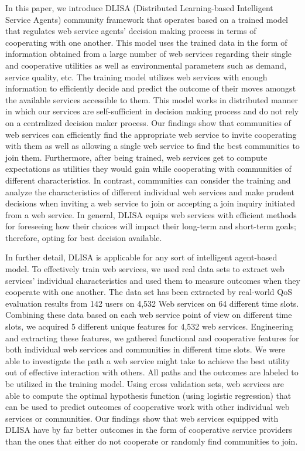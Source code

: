 \documentclass[10pt,journal,cspaper,compsoc]{IEEEtran}
\begin{document}
In this paper, we introduce DLISA (Distributed Learning-based Intelligent Service Agents) community framework that operates based on a trained model that regulates web service agents' decision making process in terms of cooperating with one another. This model uses the trained data in the form of information obtained from a large number of web services regarding their single and cooperative utilities as well as environmental parameters such as demand, service quality, etc. 
The training model utilizes web services with enough information to efficiently decide and predict the outcome of their moves amongst the available services accessible to them. This model works in distributed manner in which our services are self-sufficient in decision making process and do not rely on a centralized decision maker process. Our findings show that communities of web services can efficiently find the appropriate web service to invite cooperating with them as well as allowing a single web service to find the best communities to join them. Furthermore, after being trained, web services get to compute expectations as utilities they would gain while cooperating with communities of different characteristics. In contrast, communities can consider the training and analyze the characteristics of different individual web services and make prudent decisions when inviting a web service to join or accepting a join inquiry initiated from a web service. In general, DLISA equips web services with efficient methods for foreseeing how their choices will impact their long-term and short-term goals; therefore, opting for best decision available. 

In further detail, DLISA is applicable for any sort of intelligent agent-based model. To effectively train web services, we used real data sets to extract web services' individual characteristics and used them to measure outcomes when they cooperate with one another. The data set has been extracted by real-world QoS evaluation results from 142 users on 4,532 Web services on 64 different time slots. Combining these data based on each web service point of view on different time slots, we acquired 5 different unique features for 4,532 web services. Engineering and extracting these features, we gathered functional and cooperative features for both individual web services and communities in different time slots. We were able to investigate the path a web service might take to achieve the best utility out of effective interaction with others. All paths and the outcomes are labeled to be utilized in the training model. Using cross validation sets, web services are able to compute the optimal hypothesis function (using logistic regression) that can be used to predict outcomes of cooperative work with other individual web services or communities. Our findings show that web services equipped with DLISA have by far better outcomes in the form of cooperative service providers than the ones that either do not cooperate or randomly find communities to join. 
\end{document}
